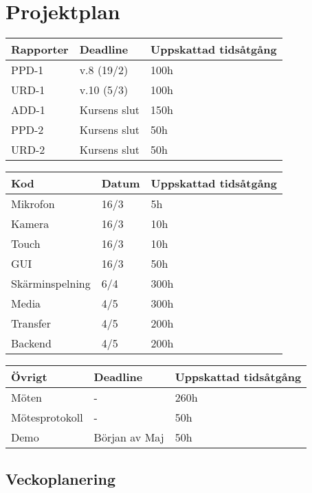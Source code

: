 
\section{Projektplan}


    \begin{tabular}{ | l | l | l |}
    \hline
    Rapporter & Deadline & Uppskattad tidsåtgång \\ \hline
    PPD-1 & v.8 (19/2) & 100h \\ \hline
    URD-1 & v.10 (5/3) & 100h \\ \hline
    ADD-1 & Kursens slut & 150h \\ \hline
    PPD-2 & Kursens slut & 50h \\ \hline
    URD-2 & Kursens slut & 50h \\ \hline
    \end{tabular}

    \begin{tabular}{ | l | l | l |}
    \hline
    Kod & Datum & Uppskattad tidsåtgång \\ \hline
    Mikrofon & 16/3 & 5h \\ \hline
    Kamera & 16/3 & 10h  \\ \hline
    Touch & 16/3 & 10h \\ \hline
    GUI & 16/3 & 50h \\ \hline
    Skärminspelning & 6/4 & 300h \\ \hline
    Media & 4/5 & 300h \\ \hline
    Transfer & 4/5 & 200h \\ \hline
    Backend & 4/5 & 200h \\ \hline
    \end{tabular}

    \begin{tabular}{ | l | l | l | }
    \hline
    Övrigt & Deadline & Uppskattad tidsåtgång \\ \hline
    Möten & - & 260h \\ \hline
    Mötesprotokoll & - & 50h \\ \hline
    Demo & Början av Maj & 50h \\ \hline
    \end{tabular}

\subsection{Veckoplanering}

